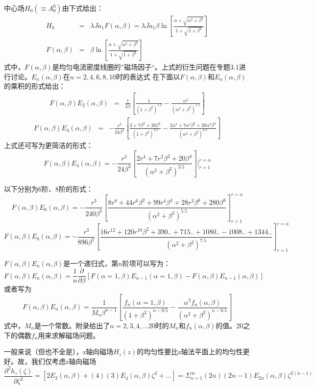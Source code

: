 中心场$H_0(\equiv A_0^0)$由下式给出：
\begin{eqnarray}\label{eqn:h0}
  H_0&=&\lambda J a_1 F(\alpha,\beta)=\lambda J a_1 \beta \ln [\frac{\alpha+\sqrt{\alpha^2+\beta^2}}{1+\sqrt{1+\beta^2}}]  \nonumber \\
  F(\alpha,\beta)&=&\beta \ln [\frac{\alpha+\sqrt{\alpha^2+\beta^2}}{1+\sqrt{1+\beta^2}}]
\end{eqnarray}
式中，$F(\alpha,\beta)$是均匀电流密度线圈的”磁场因子“。上式的衍生问题在专题3.1进行讨论。$E_n (\alpha,\beta)$在$n=2,4,6,8,10$时的表达式
在下面以$F(\alpha,\beta)$和$E_n(\alpha,\beta)$的乘积的形式给出：
\begin{eqnarray}
 F(\alpha,\beta) E_2(\alpha,\beta)&=& \frac{1}{2\beta}[\frac{1}{(1+\beta^2)^{1.5}} - \frac{\alpha^3}{(\alpha^2+\beta^2)^{1.5}}]
\end{eqnarray}
\begin{eqnarray}
 F(\alpha,\beta) E_4(\alpha,\beta)&=& -\frac{r^3}{24\beta^3}[\frac{2+7\beta^2+20\beta^4}{(1+\beta^2)^{3.5}} - \frac{2\alpha^7+7\alpha^5 \beta^2+20\alpha^3\beta^4}{(\alpha^2+\beta^2)^{3.5}}] \nonumber
\end{eqnarray}
上式还可写为更简洁的形式：
$$F(\alpha,\beta) E_4(\alpha,\beta)=-\frac{r^3}{24\beta^3}\left[\frac{2r^4+7r^2\beta^2+20\beta^4}{(\alpha^2+\beta^2)^{3.5}}\right]|_{r=1}^{r=\alpha}$$

以下分别为6阶、8阶的形式：
$$F(\alpha,\beta) E_6(\alpha,\beta)=-\frac{r^3}{240\beta^5}\left[\frac{8r^8+44 r^6\beta^2+99 r^4\beta^4+28 r^2 \beta^6+280 \beta^8}{(\alpha^2+\beta^2)^{5.5}}\right]_{r=1}^{r=\alpha}$$
$$F(\alpha,\beta) E_8(\alpha,\beta)=-\frac{r^3}{896\beta^7}\left[\frac{16 r^{12}+120 r^{10}\beta^2+390..+715..+1080..-1008..+1344..}{(\alpha^2+\beta^2)^{7.5}}\right]_{r=1}^{r=\alpha}$$


$F(\alpha,\beta) E_{n}(\alpha,\beta)$是一个递归式，第$n$阶项可以写为：
\begin{equation}
  F(\alpha,\beta) E_{n}(\alpha,\beta)=\frac{1}{n} \frac{\partial}{\partial \beta}\left[F(\alpha=1,\beta)E_{n-1}(\alpha=1,\beta)-F(\alpha,\beta)E_{n-1}(\alpha,\beta)\right]
\end{equation}
或者写为
$$ F(\alpha,\beta) E_{n}(\alpha,\beta)=\frac{1}{M_n \beta^{n-1}}\left[\frac{f_n(\alpha=1,\beta)}{(1+\beta^2)^{n-0.5}}-\frac{\alpha^3 f_n(\alpha,\beta)}{(\alpha^2+\beta^2)^{n-0.5}}\right]$$
式中，$M_n$是一个常数。附录给出了$n=2,3,4,...20$时的$M_n$和$f_n(\alpha,\beta)$的值。20之下的偶数$f_n$用来求解磁场问题。

一般来说（但也不全是），z轴向磁场$H_z(z)$的均匀性要比z轴法平面上的均匀性更好。故，我们仅考虑z轴向磁场
$$\frac{\partial^2 h_z(\zeta)}{\partial \zeta^2}=[2 E_2(\alpha,\beta)+(4)(3)E_4(\alpha,\beta)\zeta^2+...]=\Sigma_{n=1}^{\infty} (2n)(2n-1)E_{2n}(\alpha,\beta)\zeta^{2(n-1)}$$


